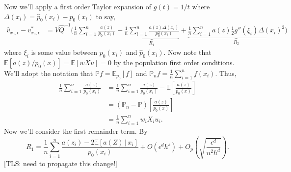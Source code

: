 \documentclass[11pt]{article}
\newcommand{\tls}[1]{{\color{cyan}[TLS: #1]}}
\begin{document}
Now we'll apply a first order Taylor expansion of $g(t) = 1/t$ where $\Delta(x_i) = \hat{p}_0(x_i) - p_0(x_i)$ to say,
\begin{align}
    \hat{v}_{x_0, \epsilon} - v^*_{x_0, \epsilon} &= V\hat{Q}^{-1}\bigg(\frac{1}{n}\sum_{i = 1}^n\frac{a(z)}{p_0(x_i)} - \underbrace{\frac{1}{n}\sum_{i = 1}^n\frac{a(z)\Delta(x_i)}{p_0^2(x_i)}}_{R_1} + \underbrace{\frac{1}{n}\sum_{i = 1}^na(z) \frac{1}{2}g''(\xi_i)\Delta(x_i)^2}_{R_2}\bigg) \label{eq: expansion with remainder}
\end{align}
where $\xi_i$ is some value between $p_0(x_i)$ and $\hat{p}_0(x_i)$. Now note that $\mathbb{E}[a(z)/p_0(x)] = \mathbb{E}[wXu] = 0$ by the population first order conditions. We'll adopt the notation that $\mathbb{P}f = \mathbb{E}_{p_0}[f]$ and $\mathbb{P}_nf = \frac{1}{n}\sum_{i = 1}^nf(x_i)$. Thus,
\begin{align*}
    \frac{1}{n}\sum_{i = 1}^n\frac{a(z)}{p_0(x_i)} &= \frac{1}{n}\sum_{i = 1}^n\frac{a(z)}{p_0(x_i)} - \mathbb{E}\left[\frac{a(z)}{p_0(x)}\right] \\
    &= (\mathbb{P}_n -\mathbb{P})\left[\frac{a(z)}{p_0(x)}\right] \\
    &= \frac{1}{n}\sum_{i = 1}^n w_i X_i u_i.
\end{align*}
Now we'll consider the first remainder term. By 
\[R_1 = \frac{1}{n}\sum_{i = 1}^n \frac{a(z_i) - 2\mathbb{E}[a(Z)\,|\,x_i]}{p_0(x_i)} + O(\epsilon^dh^s) + O_p\left( \sqrt{\frac{\epsilon^d}{n^2h^d}}\right) .\]
\tls{need to propagate this change!}
\end{document}
